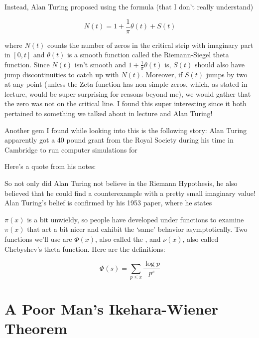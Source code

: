 \documentclass{article}
\theoremstyle{definition}
\begin{document}
Instead, Alan Turing proposed using the formula (that I don't really understand)

\[ N(t) = 1 + \frac{1}{\pi} \theta(t) + S(t) \]

where $N(t)$ counts the number of zeros in the critical strip with imaginary part 
in $ [0,t] $ and  $ \theta(t) $ is a smooth function called the Riemann-Siegel theta function.
Since $ N(t) $ isn't smooth and $ 1 + \frac{1}{\pi} \theta(t) $ is, $ S(t) $ should 
also have jump discontinuities to catch up with $ N(t) $. Moreover, if $ S(t) $ jumps 
by two at any point (unless the Zeta function has non-simple zeros, which, as stated in lecture,
would be super surprising for reasons beyond me), we would gather that the zero was not on the
critical line. I found this super interesting since it both pertained to something we talked about
in lecture and Alan Turing!

Another gem I found while looking into this is the following story: 
Alan Turing apparently got a 40 pound grant from the Royal Society during his time
in Cambridge to run computer simulations for 

Here's a quote from his notes:


So not only did Alan Turing not believe in the Riemann Hypothesis, he also believed that he
could find a counterexample with a pretty small imaginary value! Alan Turing's belief is confirmed by his
1953 paper, where he states

\newpage

$ \pi(x) $ is a bit unwieldy, so people have developed under functions to examine
$ \pi(x) $ that act a bit nicer and exhibit the `same' behavior asymptotically. Two
functions we'll use are $ \Phi(x) $, also called the , and $ \nu(x) $, also called
Chebyshev's theta function. Here are the definitions:

\[ \Phi(s) = \sum_{p \leq x} \frac{\log p }{p^{s}}\]







 
   

\appendix

\section{A Poor Man's Ikehara-Wiener Theorem}
\end{document}
